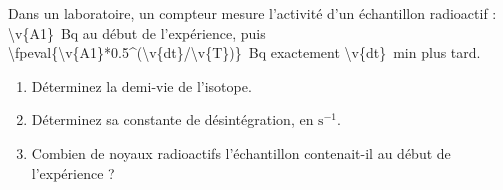 Dans un laboratoire, un compteur mesure l'activité d'un échantillon radioactif : \qty{\v{A1}}{Bq} au début de l'expérience, puis \qty[round-mode=figures,round-precision=4]{\fpeval{\v{A1}*0.5^(\v{dt}/\v{T})}}{Bq} exactement \qty{\v{dt}}{min} plus tard.

\begin{enumerate}[label=\alph*)]
    \item Déterminez la demi-vie de l'isotope.
    \item Déterminez sa constante de désintégration, en $\mathrm{s^{-1}}$.
    \item Combien de noyaux radioactifs l'échantillon contenait-il au début de l'expérience ?
\end{enumerate}

